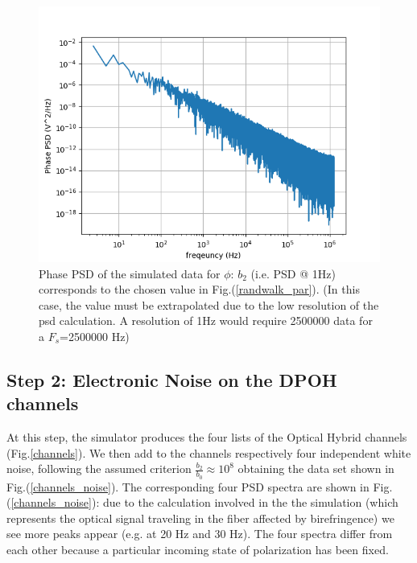 \documentclass[ fontsize=11pt]{scrartcl} %
\numberwithin{equation}{section} %
\numberwithin{figure}{section} %
\numberwithin{table}{section} %
\begin{document}
\begin{figure}[hbtp]
\centering
\includegraphics[scale=0.8]{immagini_noise/PSD_phi.png}
\caption{Phase PSD of the simulated data for $\phi$: $b_2$ (i.e. PSD @ 1Hz) corresponds to the chosen value in Fig.(\ref{randwalk_par}). (In this case, the value must be extrapolated due to the low resolution of the psd calculation. A resolution of 1Hz would require 2500000 data for a $F_s$=2500000 Hz)}
\label{PSD_phi}
\end{figure}

\clearpage

\subsection{Step 2: Electronic Noise on the DPOH channels}

At this step, the simulator produces the four lists of the Optical Hybrid channels (Fig.\ref{channels}). We then add to the channels respectively four independent white noise, following the assumed criterion $\frac{b_2}{b_0} \approx 10^{8}$ obtaining the data set shown in Fig.(\ref{channels_noise}). The corresponding four PSD spectra  are shown in Fig.(\ref{channels_noise}): due to the calculation involved in the the simulation (which represents the optical signal traveling in the fiber affected by birefringence) we see more peaks appear (e.g. at 20 Hz and 30 Hz). The  four spectra differ from each other because a particular incoming state of polarization has been fixed.
\end{document}
